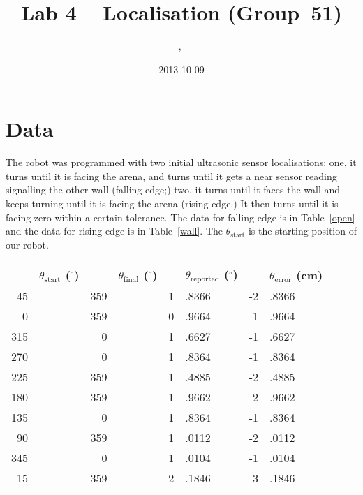 \documentclass[twocolumn]{article}
\author{\bname~--~\bid, \name~--~\id}
\title{Lab 4 -- Localisation (Group~51)}
\date{2013-10-09}
\def\degree{\ensuremath{^\circ}}
\begin{document}
\maketitle



\section{Data}

The robot was programmed with two initial ultrasonic sensor localisations: one, it turns until it is facing the arena, and turns until it gets a near sensor reading signalling the other wall (falling edge;) two, it turns until it faces the wall and keeps turning until it is facing the arena (rising edge.) It then turns until it is facing zero within a certain tolerance. The data for falling edge is in Table~\ref{open} and the data for rising edge is in Table~\ref{wall}. The $\theta_{\text{start}}$ is the starting position of our robot.

\begin{table*}[htb]
\begin{center}\begin{tabular}{r@{}l r@{}l r@{}l r@{}l}
&$\theta_{\text{start}}$ (\degree)& &$\theta_{\text{final}}$ (\degree)& &$\theta_{\text{reported}}$ (\degree)& &$\theta_{\text{error}}$ (cm) \\
\hline
45&& 359&& 1&.8366& -2&.8366 \\
0&& 359&& 0&.9664& -1&.9664 \\
315&& 0&& 1&.6627& -1&.6627 \\
270&& 0&& 1&.8364& -1&.8364 \\
225&& 359&& 1&.4885& -2&.4885 \\
180&& 359&& 1&.9662& -2&.9662 \\
135&& 0&& 1&.8364& -1&.8364 \\
90&& 359&& 1&.0112& -2&.0112 \\
345&& 0&& 1&.0104& -1&.0104 \\
15&& 359&& 2&.1846& -3&.1846 \\
\end{tabular}\end{center}
\caption{Facing out using {\tt LocalizationType.FALLING\_EDGE}.
$\theta_{\text{start}}$ is the starting orientation of the robot.
The error mean is $-2.1799$, variance is %
$0.46$, and the corrected sample standard deviation is %
$0.67$.}
\label{open}
\end{table*}
\end{document}
